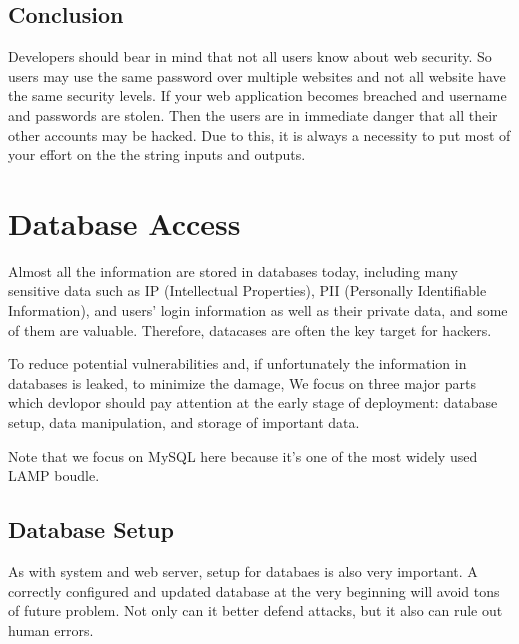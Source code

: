 \documentclass[conference]{IEEEtran}
\begin{document}
\subsection{Conclusion}
Developers should bear in mind that not all users know about web security. So users may use the same password over multiple websites and not all website have the same security levels. If your web application becomes breached and username and passwords are stolen. Then the users are in immediate danger that all their other accounts may be hacked. Due to this, it is always a necessity to put most of your effort on the the string inputs and outputs.

\section{Database Access}
Almost all the information are stored in databases today,
including many sensitive data such as
IP (Intellectual Properties),
PII (Personally Identifiable Information),
and users' login information as well as their private data,
and some of them are valuable.
Therefore,
datacases are often the key target for hackers.

To reduce potential vulnerabilities
and, if unfortunately the information in databases is leaked,
to minimize the damage,
We focus on three major parts which devlopor should pay attention
at the early stage of deployment:
database setup, data manipulation, and storage of important data. %

Note that we focus on MySQL here because it's one of
the most widely used LAMP \cite{LAMP} boudle.

\subsection{Database Setup}
As with system and web server, setup for databaes is also very important.
A correctly configured and updated database at the very beginning will
avoid tons of future problem.
Not only can it better defend attacks, but it also can rule out human errors.
\end{document}
